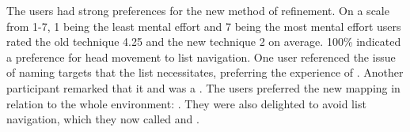 The users had strong preferences for the new method of refinement.
 On a scale from 1-7, 1 being the least mental effort and
7 being the most mental effort users rated the old technique 4.25 and
the new technique 2 on average. 100\% indicated a preference for head
movement to list navigation. One user referenced the issue of naming
targets that the list necessitates, preferring the experience of
.  Another
participant remarked that it  and was
a . The
users preferred the new mapping in relation to the whole environment:
. They were also delighted to avoid list navigation,
which they now called  and .
